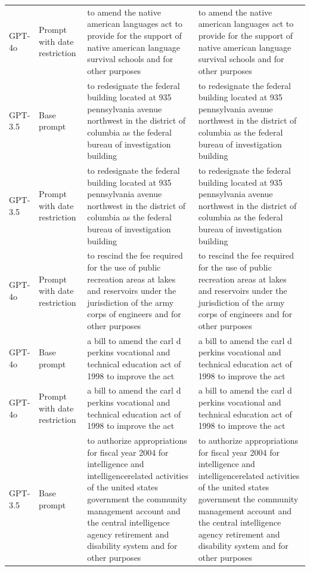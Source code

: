 \begin{longtable}{>{\raggedright\arraybackslash}p{1.4cm}>{\raggedright\arraybackslash}p{1.4cm}>{\raggedright\arraybackslash}p{5.5cm}>{\raggedright\arraybackslash}p{5.5cm}}
GPT-4o & Prompt with date restriction & to amend the native american languages act to provide for the support of native american language survival schools and for other purposes & to amend the native american languages act to provide for the support of native american language survival schools and for other purposes\\
GPT-3.5 & Base prompt & to redesignate the federal building located at 935 pennsylvania avenue northwest in the district of columbia as the federal bureau of investigation building & to redesignate the federal building located at 935 pennsylvania avenue northwest in the district of columbia as the federal bureau of investigation building\\
GPT-3.5 & Prompt with date restriction & to redesignate the federal building located at 935 pennsylvania avenue northwest in the district of columbia as the federal bureau of investigation building & to redesignate the federal building located at 935 pennsylvania avenue northwest in the district of columbia as the federal bureau of investigation building\\
GPT-4o & Prompt with date restriction & to rescind the fee required for the use of public recreation areas at lakes and reservoirs under the jurisdiction of the army corps of engineers and for other purposes & to rescind the fee required for the use of public recreation areas at lakes and reservoirs under the jurisdiction of the army corps of engineers and for other purposes\\
GPT-4o & Base prompt & a bill to amend the carl d perkins vocational and technical education act of 1998 to improve the act & a bill to amend the carl d perkins vocational and technical education act of 1998 to improve the act\\
GPT-4o & Prompt with date restriction & a bill to amend the carl d perkins vocational and technical education act of 1998 to improve the act & a bill to amend the carl d perkins vocational and technical education act of 1998 to improve the act\\
GPT-3.5 & Base prompt & to authorize appropriations for fiscal year 2004 for intelligence and intelligencerelated activities of the united states government the community management account and the central intelligence agency retirement and disability system and for other purposes & to authorize appropriations for fiscal year 2004 for intelligence and intelligencerelated activities of the united states government the community management account and the central intelligence agency retirement and disability system and for other purposes\\

\end{longtable}
